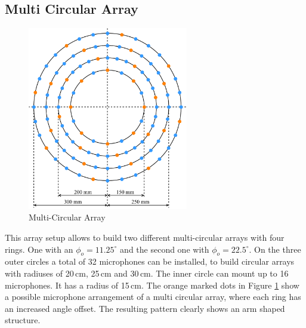 \subsection{Multi Circular Array}
\begin{minipage}{\linewidth}
	\begin{figure}
		\vspace{-0.9cm}
		\includegraphics[width=7cm]{images/5_array_evaluation/prototype_array_multi_circular.pdf}
		\centering
		\caption{Multi-Circular Array}
		\label{fig:prototype_array_multi_circular}
	\end{figure}
	This array setup allows to build two different multi-circular arrays with four rings.
	One with an $\phi_o = 11.25^\circ$ and the second one with $\phi_o = 22.5^\circ$.
	On the three outer circles a total of 32 microphones can be installed, to
	build circular arrays with radiuses of 20\,cm, 25\,cm and 30\,cm.
	The inner circle can mount up to 16 microphones.
	It has a radius of 15\,cm.
	The orange marked dots in Figure \ref{fig:prototype_array_multi_circular} show a possible microphone arrangement of a multi circular array,
	where each ring has an increased angle offset.
	The resulting pattern clearly shows an arm shaped structure.
\end{minipage}
\vspace{1.4cm}    %


